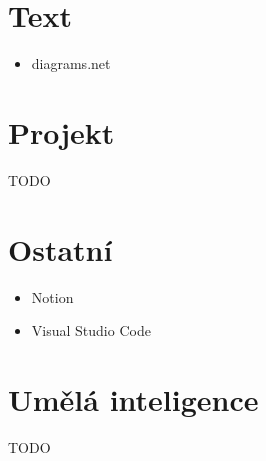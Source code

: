 \section{Text}

\begin{itemize}
    \item diagrams.net
\end{itemize}

\section{Projekt}

TODO

\section{Ostatní}

\begin{itemize}
    \item Notion
    \item Visual Studio Code
\end{itemize}

\section{Umělá inteligence}

TODO
